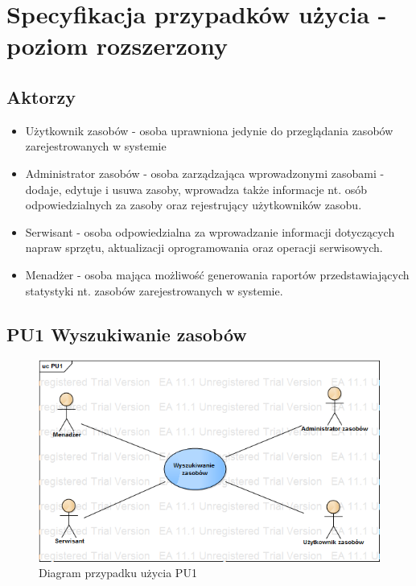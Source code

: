 \section{Specyfikacja przypadków użycia - poziom rozszerzony}
\newcommand{\myparagraph}[1]{\paragraph{#1}\mbox{}\\}

\subsection{Aktorzy}
\begin{itemize}
\item Użytkownik zasobów - osoba uprawniona jedynie do przeglądania zasobów zarejestrowanych w systemie
\item Administrator zasobów - osoba zarządzająca wprowadzonymi zasobami - dodaje, edytuje i usuwa zasoby, wprowadza także informacje nt. osób odpowiedzialnych za zasoby oraz rejestrujący użytkowników zasobu.
\item Serwisant - osoba odpowiedzialna za wprowadzanie informacji dotyczących napraw sprzętu, aktualizacji oprogramowania oraz operacji serwisowych.
\item Menadżer - osoba mająca możliwość generowania raportów przedstawiających statystyki nt. zasobów zarejestrowanych w systemie.
\end{itemize}


\subsection{PU1 Wyszukiwanie zasobów} \label{pu1}

\begin{figure}[h!]
	\centering
	\includegraphics[scale=0.6]{img/diagrams/useCaseDiagrams/PU1.png}
	\caption{Diagram przypadku użycia PU1 \label{fig:labelUCPU1}}
\end{figure}

